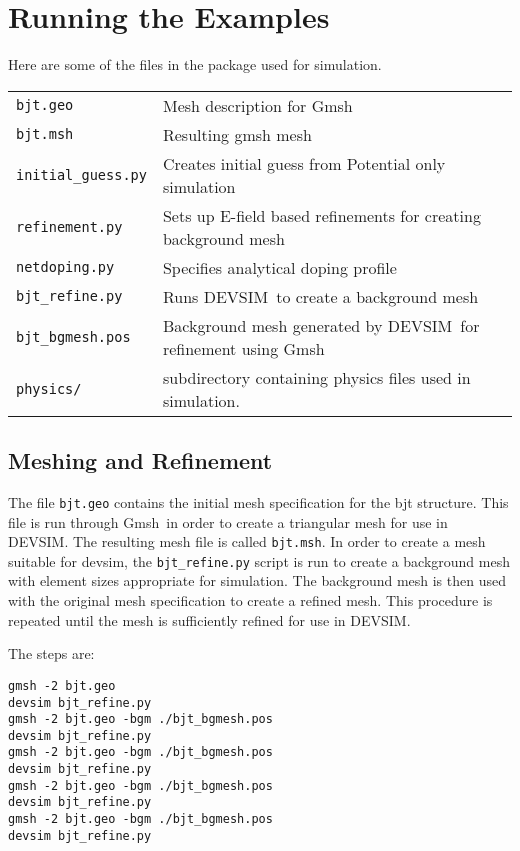 \documentclass[11pt]{article}
\newcommand{\devsim}{\mbox{DEVSIM}}
\newcommand{\gmsh}{\mbox{Gmsh}}
\begin{document}
\section{Running the Examples}
\begin{minipage}{\textwidth}
Here are some of the files in the package used for simulation.

\begin{tabular}{ll}
\texttt{bjt.geo} & Mesh description for \gmsh\\
\texttt{bjt.msh} & Resulting gmsh mesh\\
\texttt{initial\_guess.py}  & Creates initial guess from Potential only simulation\\
\texttt{refinement.py}  & Sets up E-field based refinements for creating background mesh\\
\texttt{netdoping.py}  & Specifies analytical doping profile\\
\texttt{bjt\_refine.py} & Runs \devsim\ to create a background mesh\\
\texttt{bjt\_bgmesh.pos} & Background mesh generated by \devsim\ for refinement using \gmsh\\
\texttt{physics/} & subdirectory containing physics files used in simulation.
\end{tabular}
\end{minipage}

\subsection{Meshing and Refinement}

The file \texttt{bjt.geo} contains the initial mesh specification for the bjt structure.  This file is run through \gmsh\ in order to create a triangular mesh for use in \devsim.  The resulting mesh file is called \texttt{bjt.msh}.  In order to create a mesh suitable for devsim, the \texttt{bjt\_refine.py} script is run to create a background mesh with element sizes appropriate for simulation.  The background mesh is then used with the original mesh specification to create a refined mesh.  This procedure is repeated until the mesh is sufficiently refined for use in \devsim.

\begin{minipage}{\textwidth}
The steps are:
\begin{verbatim}
gmsh -2 bjt.geo 
devsim bjt_refine.py 
gmsh -2 bjt.geo -bgm ./bjt_bgmesh.pos 
devsim bjt_refine.py 
gmsh -2 bjt.geo -bgm ./bjt_bgmesh.pos 
devsim bjt_refine.py 
gmsh -2 bjt.geo -bgm ./bjt_bgmesh.pos 
devsim bjt_refine.py 
gmsh -2 bjt.geo -bgm ./bjt_bgmesh.pos 
devsim bjt_refine.py 
\end{verbatim}
\end{minipage}
\\~\\
\end{document}
